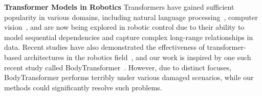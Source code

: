 \textbf{Transformer Models in Robotics}
Transformers have gained sufficient popularity in various domains, including natural language processing~\cite{vaswani2023attentionneed}, computer vision~\cite{dosovitskiy2021imageworth16x16words,qi2022high}, and are now being explored in robotic control due to their ability to model sequential dependencies and capture complex long-range relationships in data. Recent studies have also demonstrated the effectiveness of transformer-based architectures in the robotics field~\cite{chen2021decisiontransformerreinforcementlearning, kurin2021bodycagerolemorphology,gupta2022metamorphlearninguniversalcontrollers,hong2022structureaware, radosavovic2024humanoidlocomotiontokenprediction,wan2024vint}, and our work is inspired by one such recent study called BodyTransformer~\cite{sferrazza2024bodytransformerleveragingrobot}. However, due to distinct focuses, BodyTransformer performs terribly under various damaged scenarios, while our methods could significantly resolve such problems.
